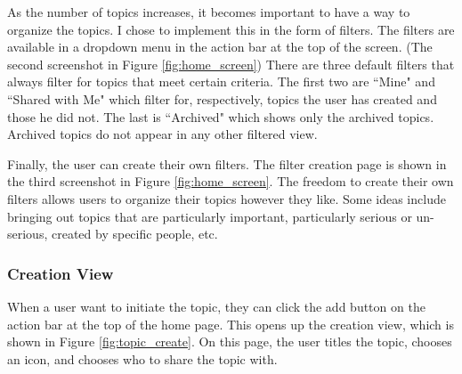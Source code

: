       As the number of topics increases,
      it becomes important to have a way to organize the topics.
      I chose to implement this in the form of filters.
      The filters are available in a dropdown menu in the action bar at the top of the screen.
      (The second screenshot in Figure \ref{fig:home_screen})
      There are three default filters that always filter for topics that meet certain criteria.
      The first two are ``Mine" and ``Shared with Me"
      which filter for, respectively, topics the user has created and those he did not.
      The last is ``Archived" which shows only the archived topics.
      Archived topics do not appear in any other filtered view.

      Finally, the user can create their own filters.
      The filter creation page is shown in the third screenshot in Figure \ref{fig:home_screen}.
      The freedom to create their own filters allows users to organize
      their topics however they like.
      Some ideas include bringing out topics that are particularly important,
      particularly serious or un-serious, created by specific people, etc.

      \subsubsection{Creation View}
      When a user want to initiate the topic,
      they can click the add button on the action bar at the top of the home page.
      This opens up the creation view, which is shown in Figure \ref{fig:topic_create}.
      On this page, the user titles the topic,
      chooses an icon, and chooses who to share the topic with.

